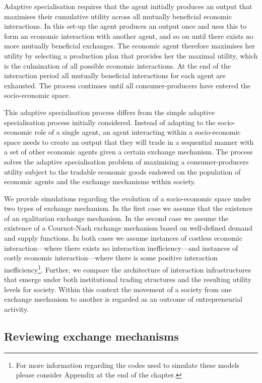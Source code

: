 Adaptive specialisation requires that the agent initially produces an output that maximises their cumulative utility across all mutually beneficial economic interactions. In this set-up the agent produces an output once and uses this to form an economic interaction with another agent, and so on until there exists no more mutually beneficial exchanges. The economic agent therefore maximises her utility by selecting a production plan that provides her the maximal utility, which is the culmination of all possible economic interactions. At the end of the interaction period all mutually beneficial interactions for each agent are exhausted. The process continues until all consumer-producers have entered the socio-economic space.

This adaptive specialisation process differs from the simple adaptive specialisation process initially considered. Instead of adapting to the socio-economic role of a single agent, an agent interacting within a socio-economic space needs to create an output that they will trade in a sequential manner with a set of other economic agents given a certain exchange mechanism. The process solves the adaptive specialisation problem of maximising a consumer-producers utility subject to the tradable economic goods endowed on the population of economic agents and the exchange mechanisms within society.

We provide simulations regarding the evolution of a socio-economic space under two types of exchange mechanism. In the first case we assume that the existence of an egalitarian exchange mechanism. In the second case we assume the existence of a Cournot-Nash exchange mechanism based on well-defined demand and supply functions. In both cases we assume instances of costless economic interaction---where there exists no interaction inefficiency---and instances of costly economic interaction---where there is some positive interaction inefficiency\footnote{For more information regarding the codes used to simulate these models please consider Appendix at the end of the chapter.}. Further, we compare the architecture of interaction infrastructures that emerge under both institutional trading structures and the resulting utility levels for society. Within this context the movement of a society from one exchange mechanism to another is regarded as an outcome of entrepreneurial activity.

\subsection{Reviewing exchange mechanisms}

